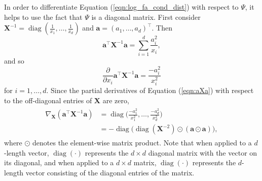\documentclass[msc,deptreport.inf]{infthesis} %
\newcommand{\matr}[1]{\mathbf{#1}}
\newcommand{\diag}{\mathop{\mathrm{diag}}}
\begin{document}
In order to differentiate Equation (\ref{eqn:log_fa_cond_dist}) with respect to $\Psi$, it helps to use the fact that $\Psi$ is a diagonal matrix. First consider $\matr{X}^{-1} = \diag(\frac{1}{x_1}, \dots, \frac{1}{x_d})$ and $\matr{a} = (a_1, \dots, a_d)^\intercal$. Then 
\begin{equation}\label{eqn:aXa}
	\matr{a}^\intercal \matr{X}^{-1} \matr{a} = \sum_{i=1}^d \frac{a_i^2}{x_i},
\end{equation}
and so
\begin{equation}
	\frac{\partial}{\partial x_i} \matr{a}^\intercal \matr{X}^{-1} \matr{a} = \frac{-a_i^2}{x_i^2}
\end{equation}
for $i=1, \dots, d$. Since the partial derivatives of Equation (\ref{eqn:aXa}) with respect to the off-diagonal entries of $\matr{X}$ are zero, 
\begin{align}\label{eqn:derivatives_diag_qaud_form}
\begin{split}
	\nabla_\matr{X} (\matr{a}^\intercal \matr{X}^{-1} \matr{a}) 
	& = \diag\Big({\frac{-a_1^2}{x_1^2}, \dots, \frac{-a_d^2}{x_d^2}}\Big) \\
	& = -\diag\Big(\diag(\matr{X}^{-2}) \odot (\matr{a} \odot \matr{a})\Big),
\end{split}
\end{align} 
where $\odot$ denotes the element-wise matrix product. Note that when applied to a $d$-length vector, $\diag(\cdot)$ represents the $d \times d$ diagonal matrix with the vector on its diagonal, and when applied to a $d \times d$ matrix, $\diag(\cdot)$ represents the $d$-length vector consisting of the diagonal entries of the matrix. 
\end{document}
